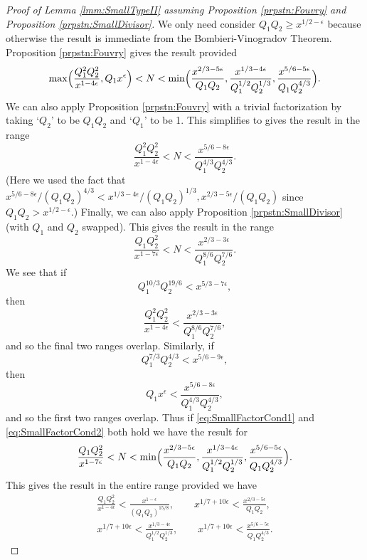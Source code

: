 \documentclass[10pt]{amsart}
\theoremstyle{plain}
\numberwithin{equation}{section}
\begin{document}
\begin{proof}[Proof of Lemma \ref{lmm:SmallTypeII} assuming Proposition \ref{prpstn:Fouvry} and Proposition \ref{prpstn:SmallDivisor}]
We only need consider $Q_1Q_2\ge x^{1/2-\epsilon}$ because otherwise the result is immediate from the Bombieri-Vinogradov Theorem.  Proposition \ref{prpstn:Fouvry} gives the result provided 
\[
\max\Bigl(\frac{Q_1^2Q_2^2}{x^{1-4\epsilon} },Q_1 x^\epsilon \Bigr)<N<\min\Bigl(\frac{x^{2/3-5\epsilon}}{Q_1Q_2},\frac{x^{1/3-4\epsilon}}{Q_1^{1/2}Q_2^{1/3}},\frac{x^{5/6-5\epsilon}}{Q_1Q_2^{4/3}}\Bigr).
\]
We can also apply Proposition \ref{prpstn:Fouvry} with a trivial factorization by taking `$Q_2$' to be $Q_1Q_2$ and `$Q_1$' to be 1. This simplifies to gives the result in the range
\[
\frac{Q_1^2Q_2^2}{x^{1-4\epsilon} }<N<\frac{x^{5/6-8\epsilon}}{Q_1^{4/3}Q_2^{4/3}}.
\]
(Here we used the fact that $x^{5/6-8\epsilon}/(Q_1Q_2)^{4/3}<x^{1/3-4\epsilon}/(Q_1Q_2)^{1/3},x^{2/3-5\epsilon}/(Q_1Q_2)$ since $Q_1Q_2>x^{1/2-\epsilon}$.) Finally, we can also apply Proposition \ref{prpstn:SmallDivisor} (with $Q_1$ and $Q_2$ swapped). This gives the result in the range
\[
\frac{Q_1Q_2^2}{x^{1-7\epsilon} }<N<\frac{x^{2/3-3\epsilon}}{Q_1^{8/6}Q_2^{7/6}}.
\]
We see that if 
\begin{equation}
Q_1^{10/3}Q_2^{19/6}<x^{5/3-7\epsilon},
\label{eq:SmallFactorCond1}
\end{equation}
 then
\[
\frac{Q_1^2Q_2^2}{x^{1-4\epsilon}}<\frac{x^{2/3-3\epsilon}}{Q_1^{8/6}Q_2^{7/6}},
\]
and so the final two ranges overlap. Similarly, if 
\begin{equation}
Q_1^{7/3} Q_2^{4/3}<x^{5/6-9\epsilon},
\label{eq:SmallFactorCond2}
\end{equation}
 then
\[
Q_1 x^\epsilon<\frac{x^{5/6-8\epsilon}}{Q_1^{4/3}Q_2^{4/3}},
\]
and so the first two ranges overlap. Thus if \eqref{eq:SmallFactorCond1} and \eqref{eq:SmallFactorCond2} both hold we have the result for
\[
\frac{Q_1 Q_2^2}{x^{1-7\epsilon}}<N<\min\Bigl(\frac{x^{2/3-5\epsilon}}{Q_1Q_2},\frac{x^{1/3-4\epsilon}}{Q_1^{1/2}Q_2^{1/3}},\frac{x^{5/6-5\epsilon}}{Q_1Q_2^{4/3}}\Bigr).
\]
This gives the result in the entire range provided we have 
\begin{align*}
\frac{Q_1Q_2^2}{x^{1-4\epsilon}}<\frac{x^{1-\epsilon}}{(Q_1Q_2)^{15/8}},\qquad
x^{1/7+10\epsilon}<\frac{x^{2/3-5\epsilon}}{Q_1Q_2},\\
x^{1/7+10\epsilon}<\frac{x^{1/3-4\epsilon}}{Q_1^{1/2}Q_2^{1/3}},\qquad x^{1/7+10\epsilon}<\frac{x^{5/6-5\epsilon}}{Q_1Q_2^{4/3}}.
\end{align*}

\end{proof}
\end{document}
